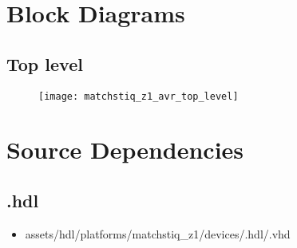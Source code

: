 \section*{Block Diagrams}
\subsection*{Top level}
\begin{figure}[ht]
	\centerline{\texttt{[image: matchstiq\_z1\_avr\_top\_level]}}
	\label{fig:tb}
\end{figure}

\section*{Source Dependencies}
\subsection*{\comp.hdl}
\begin{itemize}
	\item assets/hdl/platforms/matchstiq\_z1/devices/\comp.hdl/\comp.vhd
\end{itemize}

